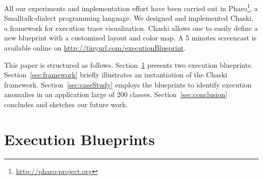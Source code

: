 \documentclass[10pt, conference, compsocconf]{IEEEtran}
\newcommand{\ab}[1]{\nb{Alexandre}{blue}{#1}}
\newcommand{\seclabel}[1]{\label{sec:#1}}
\newcommand{\secref}[1]{Section~\ref{sec:#1}}
\begin{document}
All our experiments and implementation effort have been carried out in Pharo\footnote{\url{http://pharo-project.org}}, a Smalltalk-dialect programming language. 
We designed and implemented Chaski, a framework for execution trace visualization. Chaski allows one to easily define a new blueprint with a customized layout and color map. A 5 minutes screencast is available online on \url{http://tinyurl.com/executionBlueprint}.

This paper is structured as follows. 
\secref{executionBlueprints} presents two execution blueprints.
\secref{framework} briefly illustrates an instantiation of the Chaski framework.
\secref{caseStudy} employs the blueprints to identify execution anomalies in an application large of 200 classes.
\secref{conclusion} concludes and sketches our future work.


%
%
%
%

\section{Execution Blueprints} \seclabel{executionBlueprints}

%
%
%
\end{document}
